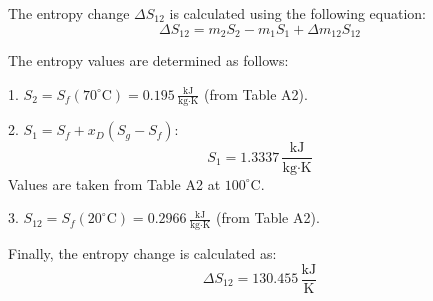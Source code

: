 The entropy change \( \Delta S_{12} \) is calculated using the following equation:  
\[
\Delta S_{12} = m_2 S_2 - m_1 S_1 + \Delta m_{12} S_{12}
\]

The entropy values are determined as follows:  

1. \( S_2 = S_f(70^\circ\text{C}) = 0.195 \, \frac{\text{kJ}}{\text{kg·K}} \) (from Table A2).  

2. \( S_1 = S_f + x_D(S_g - S_f) \):  
   \[
   S_1 = 1.3337 \, \frac{\text{kJ}}{\text{kg·K}}
   \]  
   Values are taken from Table A2 at \( 100^\circ\text{C} \).  

3. \( S_{12} = S_f(20^\circ\text{C}) = 0.2966 \, \frac{\text{kJ}}{\text{kg·K}} \) (from Table A2).  

Finally, the entropy change is calculated as:  
\[
\Delta S_{12} = 130.455 \, \frac{\text{kJ}}{\text{K}}
\]